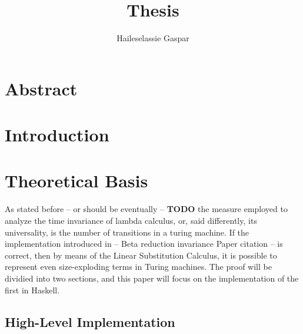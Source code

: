 \title{Thesis}
\author{Haileselassie Gaspar}


\maketitle

\section{Abstract}
\section{Introduction}
\section{Theoretical Basis}
As stated before -- or should be eventually -- \textbf{TODO} the measure employed to analyze the time invariance of lambda calculus, or, said differently, its universality, is the number of transitions in a turing machine. If the implementation introduced in -- Beta reduction invariance Paper citation -- is correct, then by means of the Linear Substitution Calculus, it is possible to represent even size-exploding terms in Turing machines. The proof will be dividied into two sections, and this paper will focus on the implementation of the first in Haskell.
\subsection*[High Level]{High-Level Implementation}




